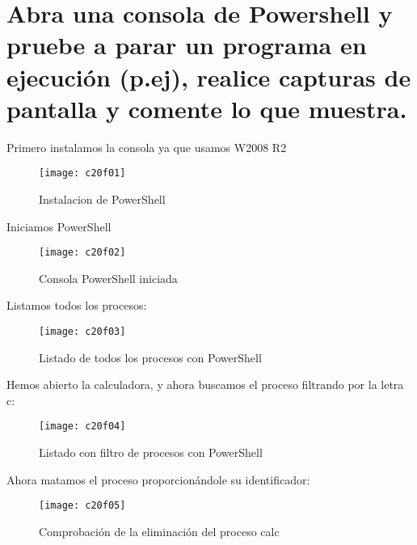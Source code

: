 \clearpage
\section{Abra una consola de Powershell y pruebe a parar un programa en ejecución (p.ej), realice capturas de pantalla y comente lo que muestra. \cite{20co01}}

Primero instalamos la consola ya que usamos W2008 R2\\
\begin{figure}[H]
	\centering
	\texttt{[image: c20f01]}
	\caption{Instalacion de PowerShell}
	\label{fig:c20f01}
\end{figure}

Iniciamos PowerShell\\
\begin{figure}[H]
	\centering
	\texttt{[image: c20f02]}
	\caption{Consola PowerShell iniciada}
	\label{fig:c20f02}
\end{figure}

Listamos todos los procesos:\\
\begin{figure}[H]
	\centering
	\texttt{[image: c20f03]}
	\caption{Listado de todos los procesos con PowerShell}
	\label{fig:c20f03}
\end{figure}


Hemos abierto la calculadora, y ahora buscamos el proceso filtrando por la letra c:\\
\begin{figure}[H]
	\centering
	\texttt{[image: c20f04]}
	\caption{Listado con filtro de procesos con PowerShell}
	\label{fig:c20f04}
\end{figure}

Ahora matamos el proceso proporcionándole su identificador:\\
\begin{figure}[H]
	\centering
	\texttt{[image: c20f05]}
	\caption{Comprobación de la eliminación del proceso calc}
	\label{fig:c20f05}
\end{figure}


\clearpage


